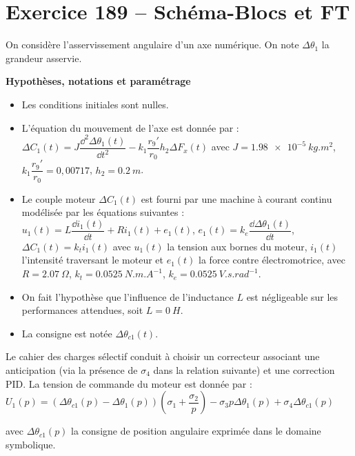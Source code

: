\section*{Exercice 189 -- Schéma-Blocs et FT}
\setcounter{exo}{0}

On considère l'asservissement angulaire d'un axe numérique. On note $\Delta \theta_1$ la grandeur asservie.

\textbf{Hypothèses, notations et paramétrage}

\begin{itemize}
\item Les conditions initiales sont nulles.
\item L'équation du mouvement de l’axe est donnée par : $\Delta C_1(t) = J \dfrac{\dd^2 \Delta \theta_1(t)}{\dd t^2}-k_1 \dfrac{r_9'}{r_0}h_2 \Delta F_x(t)$ avec $J=\SI{1,98e-5}{kg.m^2}$, $k_1 \dfrac{r_9'}{r_0} = 0,00717$, $h_2=\SI{0,2}{m}$. 
\item Le couple moteur $\Delta C_1(t)$ est fourni par une machine à courant continu modélisée par les équations suivantes : $u_1(t)=L\dfrac{\dd i_1(t)}{\dd t}+Ri_1(t) + e_1(t)$, $e_1(t)=k_e \dfrac{\dd \Delta \theta_1(t)}{\dd t}$, $\Delta C_1(t)=k_t i_1(t)$ avec $u_1(t)$ la tension aux bornes du moteur, $i_1(t)$ l’intensité traversant le moteur et $e_1(t)$ la force contre
électromotrice, avec $R=\SI{2,07}{\Omega}$,
$k_t=\SI{0,0525}{N.m.A^{-1}}$, $k_e=\SI{0,0525}{V.s.rad^{-1}}$.
\item On fait l’hypothèse que l’influence de l’inductance $L$ est négligeable sur les performances attendues, soit $L=\SI{0}{H}$.
\item La consigne est notée $\Delta \theta_{c1}(t)$.
\end{itemize}

Le cahier des charges sélectif conduit à choisir un correcteur associant une anticipation (via la présence de $\sigma_4$ dans la relation suivante) et une correction PID. La tension de commande du moteur est donnée par : 
$U_1(p)=\left( \Delta \theta_{c 1}(p)  - \Delta \theta_{1}(p)  \right) \left( \sigma_1 +\dfrac{\sigma_2}{p}\right) - \sigma_3 p \Delta \theta_1(p) + \sigma_4 \Delta \theta_{c1}(p)
 $

avec $\Delta \theta_{c1}(p)$ la consigne de position angulaire exprimée dans le domaine symbolique.



